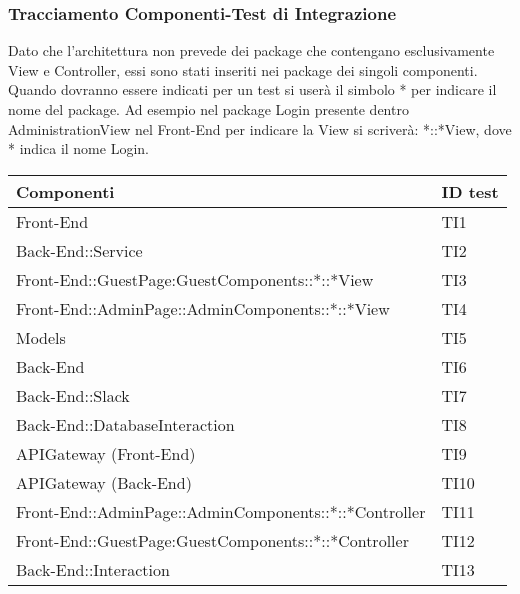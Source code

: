 \documentclass[../PianoDiQualifica_v3.0.0.tex]{subfiles}
\begin{document}
	\subsubsection{Tracciamento Componenti-Test di Integrazione}
	Dato che l'architettura non prevede dei package che contengano esclusivamente View e Controller, essi sono stati inseriti nei package dei singoli componenti. Quando dovranno essere indicati per un test si userà il simbolo * per indicare il nome del package. Ad esempio nel package Login presente dentro AdministrationView nel Front-End per indicare la View si scriverà: *::*View, dove * indica il nome Login.
	\begin{longtable}[c] { >{\centering\arraybackslash}p{11cm} >{\centering\arraybackslash}p{2cm}}
		\toprule
		\centerline{\textbf{Componenti}} & \centerline{\textbf{ID test}} \\
			\midrule
			Front-End & TI1 \\
			\addlinespace[0.3em]
			\midrule
			\addlinespace[0.3em]
			Back-End::Service & TI2 \\
			\addlinespace[0.3em]
			\midrule
			\addlinespace[0.3em]
			Front-End::GuestPage:GuestComponents::*::*View & TI3 \\
			\addlinespace[0.3em]
			\midrule
			\addlinespace[0.3em]
			Front-End::AdminPage::AdminComponents::*::*View & TI4\\
			\addlinespace[0.3em]
			\midrule
			\addlinespace[0.3em]
			Models & TI5\\
			\addlinespace[0.3em]
			\midrule
			\addlinespace[0.3em]
			Back-End & TI6\\
			\addlinespace[0.3em]
			\midrule
			\addlinespace[0.3em]
			Back-End::Slack & TI7\\
			\addlinespace[0.3em]
			\midrule
			\addlinespace[0.3em]
			Back-End::DatabaseInteraction & TI8 \\
			\addlinespace[0.3em]
			\midrule
			\addlinespace[0.3em]
			APIGateway (Front-End) & TI9\\
			\addlinespace[0.3em]
			\midrule
			\addlinespace[0.3em]
			APIGateway (Back-End) & TI10\\
			\addlinespace[0.3em]
			\midrule
			\addlinespace[0.3em]
			Front-End::AdminPage::AdminComponents::*::*Controller & TI11\\
			\addlinespace[0.3em]
			\midrule
			\addlinespace[0.3em]
			Front-End::GuestPage:GuestComponents::*::*Controller & TI12\\
			\addlinespace[0.3em]
			\midrule
			\addlinespace[0.3em]
			Back-End::Interaction & TI13 \\

\end{longtable}
\end{document}
